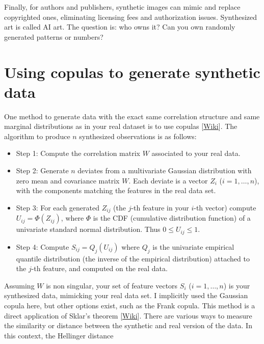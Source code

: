 \documentclass[oneside,10pt]{book}
\begin{document}
Finally, for authors and publishers, synthetic images can mimic and replace copyrighted ones, eliminating licensing fees and authorization issues.  Synthesized art is called \textcolor{index}{AI art}. The question is: who owns it? Can you own randomly generated patterns or numbers?


\section{Using copulas to generate synthetic data}\label{piviiiurobvbc}

One method to generate data with the exact same correlation structure and same marginal distributions as in your real dataset is to use \textcolor{index}{copulas} [\href{https://en.wikipedia.org/wiki/Copula_(probability_theory)}{Wiki}]. The algorithm to produce $n$ synthesized observations is as follows: \vspace{1ex}
\begin{itemize}
\item Step 1: Compute the correlation matrix $W$ associated to your real data.
\item Step 2: Generate $n$ deviates from a multivariate Gaussian distribution with zero mean and covariance matrix $W$. Each deviate is a
 vector $Z_i$ ($i=1,\dots,n$), with the components matching the features in the real data set.
\item Step 3: For each generated $Z_{ij}$ (the $j$-th feature in your $i$-th vector) compute $U_{ij}=\Phi(Z_{ij})$, where $\Phi$ is
 the CDF (cumulative distribution function) of a univariate standard normal distribution. Thus $0\leq U_{ij}\leq 1$.
\item Step 4: Compute $S_{ij}=Q_j(U_{ij})$ where $Q_j$ is the univariate
\textcolor{index}{empirical quantile distribution} (the inverse of the \textcolor{index}{empirical distribution}) attached to the $j$-th feature, and computed on the real data.
\end{itemize}\vspace{1ex}
Assuming $W$ is non singular, your set of feature vectors $S_i$ ($i=1,\dots,n$) is your synthesized data, mimicking your real data set.
I implicitly used the \textcolor{index}{Gaussian copula} here, but other options exist, such as the
\textcolor{index}{Frank copula}. This method is a direct application
 of \textcolor{index}{Sklar's theorem} [\href{https://en.wikipedia.org/wiki/Copula_(probability_theory)#Sklar's_theorem}{Wiki}]. There are various ways to measure the similarity or distance between the synthetic and real version of the data. In this context, the \textcolor{index}{Hellinger distance}
\end{document}
